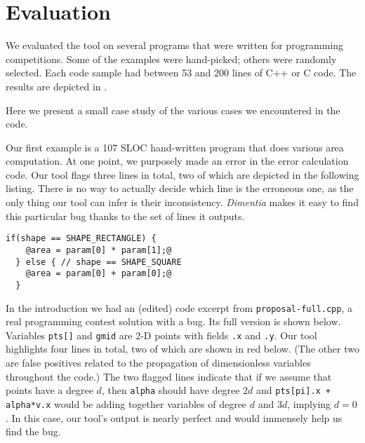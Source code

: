 \documentclass[12pt]{article}
\begin{document}
\section{Evaluation}

We evaluated the tool on several programs that were written for programming competitions.
Some of the examples were hand-picked; others were randomly selected.
Each code sample had between 53 and 200 lines of C++ or C code.
The results are depicted in .

\begin{table}[H]
  \caption{Evaluation results}
  \label{table:eval-results}
\end{table}

Here we present a small case study of the various cases we encountered in the code.

Our first example is a 107 SLOC hand-written program that does various area computation.
At one point, we purposely made an error in the error calculation code.
Our tool flags three lines in total, two of which are depicted in the following listing.
There is no way to actually decide which line is the erroneous one, as the
only thing our tool can infer is their inconsistency.
\textit{Dimentia} makes it easy to find this particular bug thanks to the set of lines it outputs.

\begin{lstlisting}[label=quadrilateral.c]
  if(shape == SHAPE_RECTANGLE) {
    @area = param[0] * param[1];@
  } else { // shape == SHAPE_SQUARE
    @area = param[0] + param[0];@
  }
\end{lstlisting}

In the introduction we had an (edited) code excerpt from \texttt{proposal-full.cpp},
a real programming contest solution with a bug.
Its full version is shown below.
Variables \texttt{pts[]} and \texttt{gmid} are 2-D points with fields \texttt{.x} and \texttt{.y}.
Our tool highlights four lines in total, two of which are shown in red below.
(The other two are false positives related to the propagation of dimensionless variables throughout the code.)
The two flagged lines indicate that if we assume that points have a degree $d$,
then \texttt{alpha} should have degree $2d$ and \texttt{pts[pi].x + alpha*v.x} would
be adding together variables of degree $d$ and $3d$, implying $d = 0$.
In this case, our tool's output is nearly perfect and would immensely help us find the bug.
\end{document}
